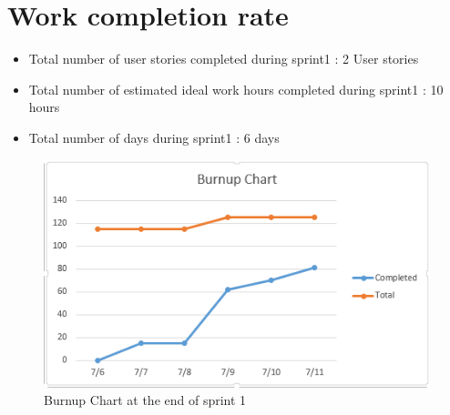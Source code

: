 \documentclass[10pt]{article}
\newcommand{\fancysecX}[2] {{\color{primary}\section*{#1} \label{sec:#2}}}
\begin{document}
\fancysecX{Work completion rate}{completeRate}

	\begin{itemize}
            \item Total number of user stories completed during sprint1 : 2 User stories
    \end{itemize}

    \begin{itemize}
            \item Total number of estimated ideal work hours completed during sprint1 : 10 hours
    \end{itemize}

    \begin{itemize}
            \item Total number of days during sprint1 : 6 days
    \end{itemize}


    \begin{figure}[!ht]
  	\caption{Burnup Chart at the end of sprint 1}
  	\centering
    		\includegraphics[width=1\textwidth]{Burnupchart1}
    \end{figure}

\vspace{5cm}
\end{document}
